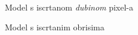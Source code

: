 \begin{figure}[H]
\label{fig:monkey-depth}
\begin{center}
\caption{Model s iscrtanom \emph{dubinom} pixel-a}
\end{center}
\end{figure}


\begin{figure}[H]
\label{fig:monkey-edges}
\begin{center}
\caption{Model s iscrtanim obrisima}
\end{center}
\end{figure}

